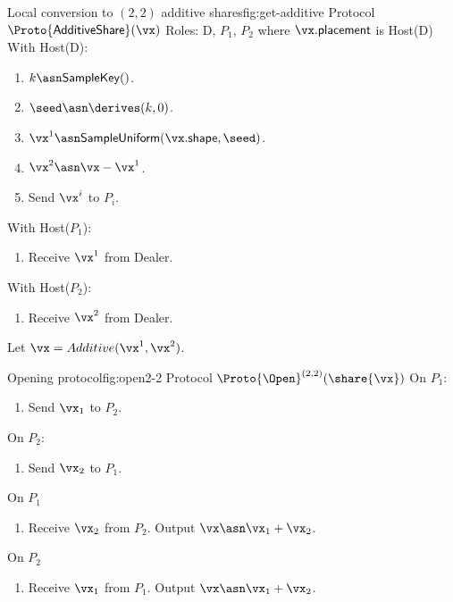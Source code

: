 \begin{Boxfig}{Local conversion to $(2,2)$ additive shares}{fig:get-additive}
  {Protocol $\Proto{\mathsf{AdditiveShare}}(\vx)$}
  Roles: D, $P_1$, $P_2$ where $\vx.\mathsf{placement}$ is Host(D) \newline
  With Host(D):
  \begin{enumerate}
    \item $k \asn \mathsf{SampleKey}()$.
    \item $\seed \asn \derives(k, 0)$.
    \item $\vx^1 \asn \mathsf{SampleUniform}(\vx.\mathsf{shape}, \seed)$.
    \item $\vx^2 \asn \vx - \vx^1$.
    \item Send $\vx^i$ to $P_i$.
  \end{enumerate}
  With Host($P_1$):
  \begin{enumerate}
      \item Receive $\vx^1$ from Dealer.
  \end{enumerate}
  With Host($P_2$):
  \begin{enumerate}
      \item Receive $\vx^2$ from Dealer.
  \end{enumerate}
  Let $\vx = Additive(\vx^1, \vx^2)$.
\end{Boxfig}

\begin{Boxfig}{Opening protocol}{fig:open2-2}
  {Protocol $\Proto{\Open}^{(2,2)}(\share{\vx})$}
  On $P_1$:
  \begin{enumerate}
    \item Send $\vx_1$ to $P_2$.
  \end{enumerate}
   On $P_2$:
  \begin{enumerate}
    \item Send $\vx_2$ to $P_1$.
  \end{enumerate}
  On $P_1$
  \begin{enumerate}
    \item Receive $\vx_2$ from $P_2$. Output
    $\vx \asn \vx_1 + \vx_2$.
  \end{enumerate}
  On $P_2$
  \begin{enumerate}
    \item Receive $\vx_1$ from $P_1$. Output $\vx \asn \vx_1 + \vx_2$.
  \end{enumerate}
\end{Boxfig}


